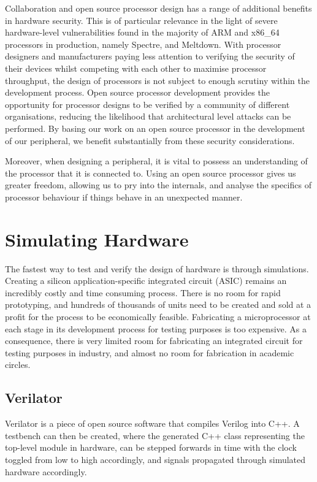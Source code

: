 \documentclass[a4paper,8pt]{report}
\begin{document}
Collaboration and open source processor
design has a range of additional benefits in hardware security. This is of
particular relevance in the light of severe hardware-level vulnerabilities found
in the majority of ARM and x86\_64 processors in production, namely Spectre, and
Meltdown. With processor designers and manufacturers paying less attention to
verifying the security of their devices whilst competing with each other to
maximise processor throughput, the design of processors is not subject to enough
scrutiny within the development process. Open source processor development
provides the opportunity for processor designs to be verified by a community of
different organisations, reducing the likelihood that architectural level
attacks can be performed. By basing our work on an open source processor in the
development of our peripheral, we benefit substantially from these security
considerations.

Moreover, when designing a peripheral, it is vital to possess an understanding
of the processor that it is connected to. Using an open source processor gives
us greater freedom, allowing us to pry into the internals, and analyse the
specifics of processor behaviour if things behave in an unexpected manner.


\section{Simulating Hardware} 
The fastest way to test and verify the design of hardware is through simulations.
Creating a silicon application-specific integrated circuit (ASIC) remains an
incredibly costly and time consuming process.
There is no room for rapid prototyping, and hundreds of thousands of units need
to be created and sold at a profit for the process to be economically
feasible. Fabricating a microprocessor at each stage in its development process
for testing purposes is too expensive. As a consequence, there is very
limited room for fabricating an integrated circuit for testing purposes in
industry, and almost no room for fabrication in academic circles.

\subsection{Verilator}
Verilator is a piece of open source software that compiles Verilog into C++. A
testbench can then be created, where the generated C++ class representing the
top-level module in hardware, can be stepped forwards in time with the clock
toggled from low to high accordingly, and signals propagated through simulated
hardware accordingly.
\end{document}
